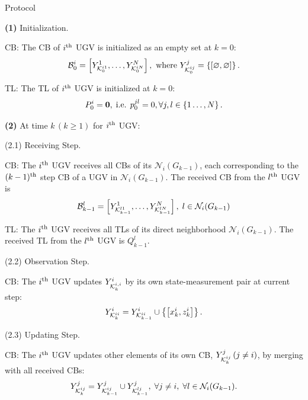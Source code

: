 	\begin{algorithm}
		\caption{{\proto} Protocol}
		\label{alg:lifo}
		\begin{algorithmic}
			\State \textbf{(1)} Initialization.
			
			CB: 
			The CB of $i^\text{th}$ UGV is initialized as an empty set at $k=0$:
			\small\begin{equation*}
				{\mathcal{B}^i_0=\left[ Y^1_{\mathcal{K}^{i1}_{0}},\dots,Y^N_{\mathcal{K}^{iN}_{0}}\right], \text{ where } Y^j_{\mathcal{K}^{ij}_0} = \left\lbrace\left[ \varnothing,\varnothing\right]\right\rbrace.}
			\end{equation*}\normalsize
			
			TL:
			The TL of $i^\text{th}$ UGV is initialized at $k=0$:
			\small\begin{equation*}
				P^i_0 = \mathbf{0},\;\text{i.e. } p^{jl}_0=0, \forall j,l\in \left\lbrace 1\dots,N\right\rbrace.
			\end{equation*}\normalsize
			
			\State \textbf{(2)} At time $k\,(k\geq 1)$ for $i^\text{th}$ UGV:	
			
			\State (2.1) Receiving Step.
			
			CB:	The $i^\text{th}$ UGV receives all CBs of its {\dnbhd} $\mathcal{N}_i(G_{k-1})$,
			each corresponding to the $(k-1)^\text{th}$ step CB of a UGV in $\mathcal{N}_i(G_ {k-1})$. 
			The received CB from the $l^\text{th}$ UGV is
			\small\begin{equation*}
				\mathcal{B}^l_{k-1}=\left[Y^1_{\mathcal{K}^{l1}_{k-1}},\dots,Y^N_{\mathcal{K}^{lN}_{k-1}}\right],\; l\in\mathcal{N}_i(G_{k-1})
			\end{equation*}\normalsize
			
			TL: The $i^\text{th}$ UGV receives all TLs of its direct neighborhood $\mathcal{N}_i(G_{k-1})$.
			The received TL from the $l^\text{th}$ UGV is $Q^l_{k-1}$.
			\newline
			
			\State (2.2) Observation Step.
			
			CB: The $i^\text{th}$ UGV updates $Y^i_{\mathcal{K}^{i,i}_{k}}$ by its own state-measurement pair at current step:
			\small\begin{equation*}
			Y^i_{\mathcal{K}^{ii}_{k}} = Y^i_{\mathcal{K}^{ii}_{k-1}} \cup \left\lbrace{\left[x^i_k,z^i_k\right]}\right\rbrace.
			\end{equation*}\normalsize
						
			\State (2.3) Updating Step.
			
			CB: The $i^\text{th}$ UGV updates other elements of its own CB, $Y^j_{\mathcal{K}^{ij}_{k}}\,(j\neq i)$, by merging with all received CBs:						
			\small\begin{equation*}
				Y^j_{\mathcal{K}^{ij}_{k}} = Y^j_{\mathcal{K}^{ij}_{k-1}} \cup Y^j_{\mathcal{K}^{lj}_{k-1}},
				\; \forall j\neq i,\;\forall l\in \mathcal{N}_i(G_{k-1}).
			\end{equation*}\normalsize
			

\end{algorithmic}
\end{algorithm}

